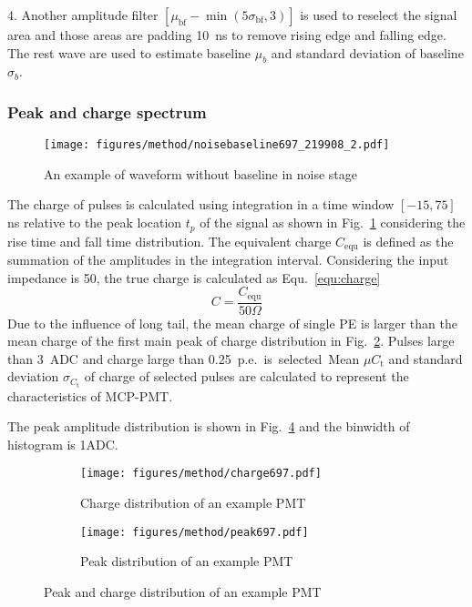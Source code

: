 4. Another amplitude filter $[\mu_{\mathrm{bf}}-\min(5\sigma_{\mathrm{bf}},3)]$ is used to reselect the signal area and those areas are padding \SI{10}{ns} to remove rising edge and falling edge. The rest wave are used to estimate baseline $\mu_b$ and standard deviation of baseline $\sigma_b$.

\subsubsection{Peak and charge spectrum}
\label{sec:noisepeak}
\begin{figure}[!htbp]
    \texttt{[image: figures/method/noisebaseline697\_219908\_2.pdf]}
    \caption{An example of waveform without baseline in noise stage}
    \label{fig:baseline2}
\end{figure}
The charge of pulses is calculated using integration in a time window $[-15, 75]$ ns relative to the peak location $t_p$ of the signal as shown in Fig.~\ref{fig:baseline2} considering the rise time and fall time distribution. The equivalent charge $C_{\mathrm{equ}}$ is defined as the summation of the amplitudes in the integration interval. Considering the input impedance is \SI{50}{\Omega}, the true charge is calculated as Equ.~\eqref{equ:charge} 
\begin{equation}
    \label{equ:charge}
    C = \frac{C_{\mathrm{equ}}}{50 \Omega}
\end{equation}
Due to the influence of long tail, the mean charge of single PE is larger than the mean charge of the first main peak of charge distribution in Fig.~\ref{fig:charge}. Pulses large than \SI{3}{ADC} and charge large than \SI{0.25}{p.e.} is selected. Mean $\mu{C_{\mathrm{t}}}$ and standard deviation $\sigma_{C_{\mathrm{t}}}$ of charge of selected pulses are calculated to represent the characteristics of MCP-PMT.

The peak amplitude distribution is shown in Fig.~\ref{fig:peak} and the binwidth of histogram is 1ADC.
\begin{figure}[!htbp]
    \centering
    \begin{subfigure}[t]{0.45\textwidth}
        \texttt{[image: figures/method/charge697.pdf]}
        \caption{Charge distribution of an example PMT}%
        \label{fig:charge}
    \end{subfigure}
    \begin{subfigure}[t]{0.45\textwidth}
        \texttt{[image: figures/method/peak697.pdf]}
        \caption{Peak distribution of an example PMT}%
        \label{fig:peak}
    \end{subfigure}
    \caption{Peak and charge distribution of an example PMT}
\end{figure}
